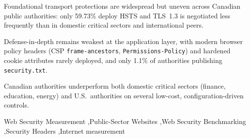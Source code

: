 \documentclass[a4paper,fleqn]{cas-sc}
\begin{document}
\begin{highlights}
\item Foundational transport protections are widespread but uneven across Canadian public authorities: only 59.73\% deploy HSTS and TLS~1.3 is negotiated less frequently than in domestic critical sectors and international peers.
\item Defense-in-depth remains weakest at the application layer, with modern browser policy headers (CSP \texttt{frame-ancestors}, \texttt{Permissions-Policy}) and hardened cookie attributes rarely deployed, and only 1.1\% of authorities publishing \texttt{security.txt}.
\item Canadian authorities underperform both domestic critical sectors (finance, education, energy) and U.S.\ authorities on several low-cost, configuration-driven controls.
\end{highlights}

\begin{keywords}
Web Security Measurement \sep Public-Sector Websites \sep Web Security Benchmarking \sep Security Headers \sep Internet measurement
\end{keywords}

\maketitle
\end{document}
